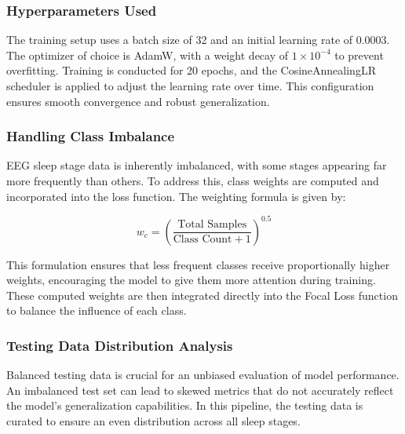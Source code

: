 \subsubsection*{Hyperparameters Used}

The training setup uses a batch size of 32 and an initial learning rate of 0.0003. The optimizer of choice is AdamW, with a weight decay of $1 \times 10^{-4}$ to prevent overfitting. Training is conducted for 20 epochs, and the CosineAnnealingLR scheduler is applied to adjust the learning rate over time. This configuration ensures smooth convergence and robust generalization.

\subsubsection*{Handling Class Imbalance}

EEG sleep stage data is inherently imbalanced, with some stages appearing far more frequently than others. To address this, class weights are computed and incorporated into the loss function. The weighting formula is given by:

\[
w_c = \left( \frac{\text{Total Samples}}{\text{Class Count} + 1} \right)^{0.5}
\]

This formulation ensures that less frequent classes receive proportionally higher weights, encouraging the model to give them more attention during training. These computed weights are then integrated directly into the Focal Loss function to balance the influence of each class.

\subsubsection*{Testing Data Distribution Analysis}

Balanced testing data is crucial for an unbiased evaluation of model performance. An imbalanced test set can lead to skewed metrics that do not accurately reflect the model’s generalization capabilities. In this pipeline, the testing data is curated to ensure an even distribution across all sleep stages.  













































